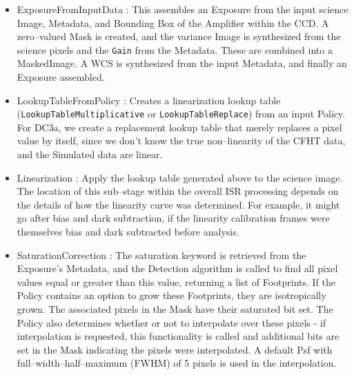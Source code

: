 \begin{itemize}

\item ExposureFromInputData : This assembles an Exposure from the
input science Image, Metadata, and Bounding Box of the Amplifier
within the CCD.  A zero--valued Mask is created, and the variance
Image is synthesized from the science pixels and the {\tt Gain} from
the Metadata.  These are combined into a MaskedImage.  A WCS is
synthesized from the input Metadata, and finally an Exposure assembled.

\item LookupTableFromPolicy : Creates a linearization lookup table
({\tt LookupTableMultiplicative} or {\tt LookupTableReplace}) from an
input Policy.
For DC3a, we create a replacement lookup table that
merely replaces a pixel value by itself, since we don't know the true
non--linearity of the CFHT data, and the Simulated data are linear.

\item Linearization : Apply the lookup table generated above to the
science image.  The location of this sub--stage within the overall ISR
processing depends on the details of how the linearity curve was
determined.  For example, it might go after bias and dark subtraction,
if the linearity calibration frames were themselves bias and dark
subtracted before analysis.

\item SaturationCorrection : The saturation keyword is retrieved from
the Exposure's Metadata, and the Detection algorithm is called to find
all pixel values equal or greater than this value, returning a list of
Footprints.  If the Policy contains an option to grow these
Footprints, they are isotropically grown.  The associated pixels in
the Mask have their saturated bit set.  The Policy also determines
whether or not to interpolate over these pixels - if interpolation is
requested, this functionality is called and additional bits are set in
the Mask indicating the pixels were interpolated.  A default Psf with
full--width--half--maximum (FWHM) of 5 pixels is used in the
interpolation.


\end{itemize}
